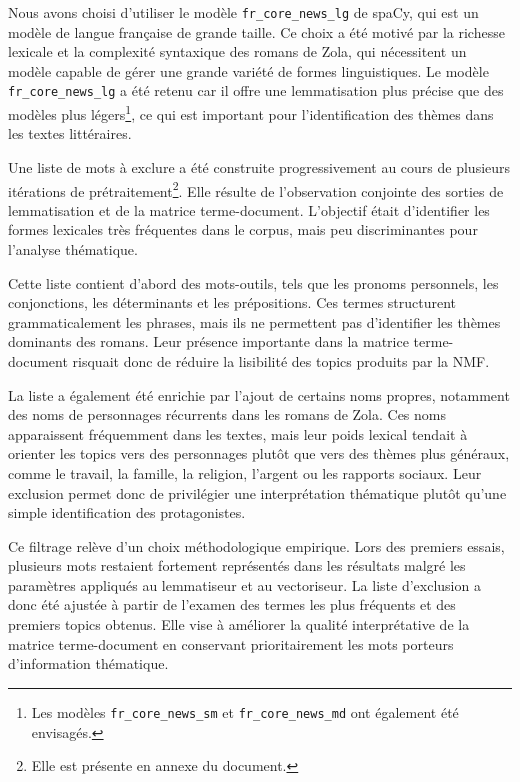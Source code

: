 \documentclass{article}
\begin{document}
Nous avons choisi d'utiliser le modèle \texttt{fr\_core\_news\_lg} de spaCy, qui est un modèle de langue française de grande taille. Ce choix a été motivé par la richesse lexicale et la complexité syntaxique des romans de Zola, qui nécessitent un modèle capable de gérer une grande variété de formes linguistiques. Le modèle \texttt{fr\_core\_news\_lg} a été retenu car il offre une lemmatisation plus précise que des modèles plus légers\footnote{Les modèles \texttt{fr\_core\_news\_sm} et \texttt{fr\_core\_news\_md} ont également été envisagés.}, ce qui est important pour l'identification des thèmes dans les textes littéraires.


Une liste de mots à exclure a été construite progressivement au cours de plusieurs itérations de prétraitement\footnote{Elle est présente en annexe du document.}. Elle résulte de l'observation conjointe des sorties de lemmatisation et de la matrice terme-document. L'objectif était d'identifier les formes lexicales très fréquentes dans le corpus, mais peu discriminantes pour l'analyse thématique.

Cette liste contient d'abord des mots-outils, tels que les pronoms personnels, les conjonctions, les déterminants et les prépositions. Ces termes structurent grammaticalement les phrases, mais ils ne permettent pas d'identifier les thèmes dominants des romans. Leur présence importante dans la matrice terme-document risquait donc de réduire la lisibilité des topics produits par la NMF.

La liste a également été enrichie par l'ajout de certains noms propres, notamment des noms de personnages récurrents dans les romans de Zola. Ces noms apparaissent fréquemment dans les textes, mais leur poids lexical tendait à orienter les topics vers des personnages plutôt que vers des thèmes plus généraux, comme le travail, la famille, la religion, l'argent ou les rapports sociaux. Leur exclusion permet donc de privilégier une interprétation thématique plutôt qu'une simple identification des protagonistes.

Ce filtrage relève d'un choix méthodologique empirique. Lors des premiers essais, plusieurs mots restaient fortement représentés dans les résultats malgré les paramètres appliqués au lemmatiseur et au vectoriseur. La liste d'exclusion a donc été ajustée à partir de l'examen des termes les plus fréquents et des premiers topics obtenus. Elle vise à améliorer la qualité interprétative de la matrice terme-document en conservant prioritairement les mots porteurs d'information thématique.
\end{document}
